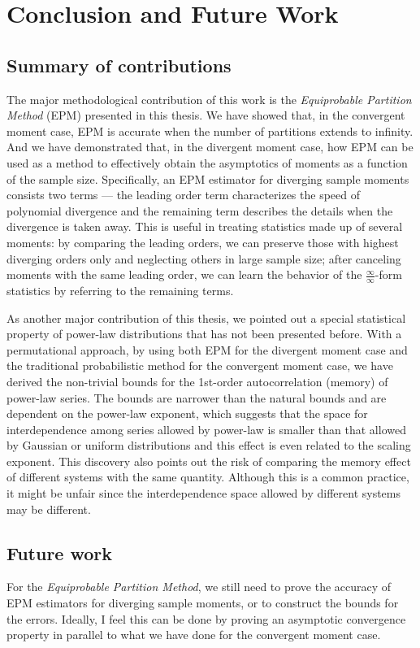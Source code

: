 
\chapter{Conclusion and Future Work}
\section{Summary of contributions}
The major methodological contribution of this work is the \textit{Equiprobable Partition Method} (EPM) presented in this thesis. We have showed that, in the convergent moment case, EPM is accurate when the number of partitions extends to infinity. And we have demonstrated that, in the divergent moment case, how EPM can be used as a method to effectively obtain the asymptotics of moments as a function of the sample size. Specifically, an EPM estimator for diverging sample moments consists two terms --- the leading order term characterizes the speed of polynomial divergence and the remaining term describes the details when the divergence is taken away. This is useful in treating statistics made up of several moments: by comparing the leading orders, we can preserve those with highest diverging orders only and neglecting others in large sample size; after canceling moments with the same leading order, we can learn the behavior of the $ \frac{\infty}{\infty} $-form statistics by referring to the remaining terms.   

As another major contribution of this thesis, we pointed out a special statistical property of power-law distributions that has not been presented before. With a permutational approach, by using both EPM for the divergent moment case and the traditional probabilistic method for the convergent moment case, we have derived the non-trivial bounds for the 1st-order autocorrelation (memory) of power-law series. The bounds are narrower than the natural bounds and are dependent on the power-law exponent, which suggests that the space for interdependence among series allowed by power-law is smaller than that allowed by Gaussian or uniform distributions and this effect is even related to the scaling exponent. This discovery also points out the risk of comparing the memory effect of different systems with the same quantity. Although this is a common practice, it might be unfair since the interdependence space allowed by different systems may be different. 

\section{Future work}
For the \textit{Equiprobable Partition Method}, we still need to prove the accuracy of EPM estimators for diverging sample moments, or to construct the bounds for the errors. Ideally, I feel this can be done by proving an asymptotic convergence property in parallel to what we have done for the convergent moment case. 

